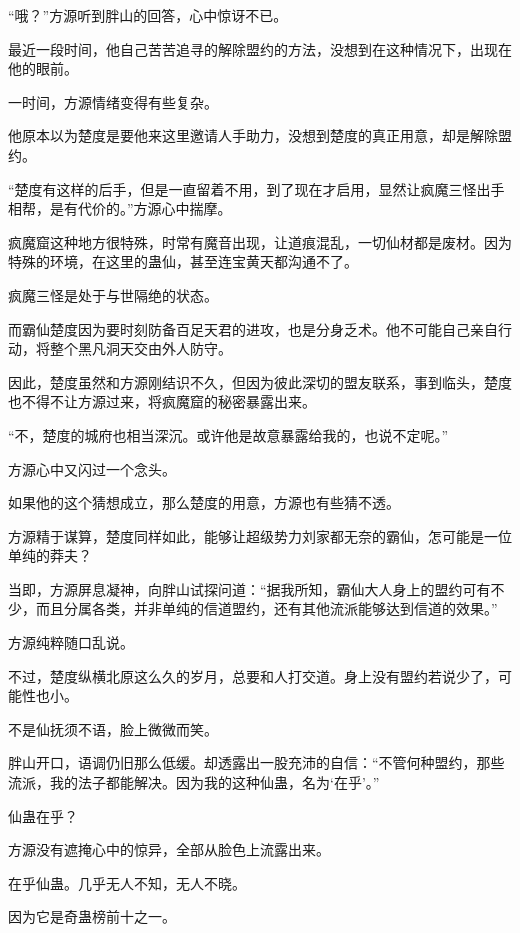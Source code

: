 
\begin{this_body}

“哦？”方源听到胖山的回答，心中惊讶不已。

最近一段时间，他自己苦苦追寻的解除盟约的方法，没想到在这种情况下，出现在他的眼前。

一时间，方源情绪变得有些复杂。

他原本以为楚度是要他来这里邀请人手助力，没想到楚度的真正用意，却是解除盟约。

“楚度有这样的后手，但是一直留着不用，到了现在才启用，显然让疯魔三怪出手相帮，是有代价的。”方源心中揣摩。

疯魔窟这种地方很特殊，时常有魔音出现，让道痕混乱，一切仙材都是废材。因为特殊的环境，在这里的蛊仙，甚至连宝黄天都沟通不了。

疯魔三怪是处于与世隔绝的状态。

而霸仙楚度因为要时刻防备百足天君的进攻，也是分身乏术。他不可能自己亲自行动，将整个黑凡洞天交由外人防守。

因此，楚度虽然和方源刚结识不久，但因为彼此深切的盟友联系，事到临头，楚度也不得不让方源过来，将疯魔窟的秘密暴露出来。

“不，楚度的城府也相当深沉。或许他是故意暴露给我的，也说不定呢。”

方源心中又闪过一个念头。

如果他的这个猜想成立，那么楚度的用意，方源也有些猜不透。

方源精于谋算，楚度同样如此，能够让超级势力刘家都无奈的霸仙，怎可能是一位单纯的莽夫？

当即，方源屏息凝神，向胖山试探问道：“据我所知，霸仙大人身上的盟约可有不少，而且分属各类，并非单纯的信道盟约，还有其他流派能够达到信道的效果。”

方源纯粹随口乱说。

不过，楚度纵横北原这么久的岁月，总要和人打交道。身上没有盟约若说少了，可能性也小。

不是仙抚须不语，脸上微微而笑。

胖山开口，语调仍旧那么低缓。却透露出一股充沛的自信：“不管何种盟约，那些流派，我的法子都能解决。因为我的这种仙蛊，名为‘在乎’。”

仙蛊在乎？

方源没有遮掩心中的惊异，全部从脸色上流露出来。

在乎仙蛊。几乎无人不知，无人不晓。

因为它是奇蛊榜前十之一。


\end{this_body}
